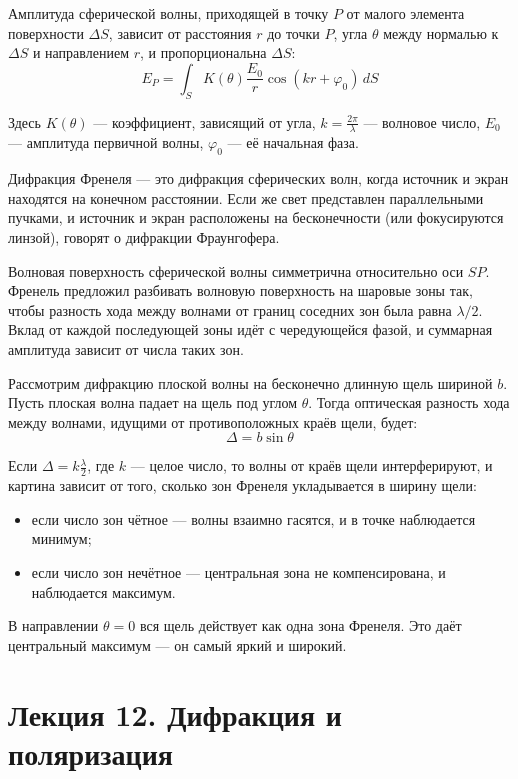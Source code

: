 \documentclass[12pt]{article}
\begin{document}
Амплитуда сферической волны, приходящей в точку $P$ от малого элемента поверхности $\Delta S$, зависит от расстояния $r$ до точки $P$, угла $\theta$ между нормалью к $\Delta S$ и направлением $r$, и пропорциональна $\Delta S$:
\[ E_P = \int_S K(\theta) \frac{E_0}{r} \cos(kr + \varphi_0)\, dS \]

Здесь $K(\theta)$ — коэффициент, зависящий от угла, $k = \frac{2\pi}{\lambda}$ — волновое число, $E_0$ — амплитуда первичной волны, $\varphi_0$ — её начальная фаза.

Дифракция Френеля — это дифракция сферических волн, когда источник и экран находятся на конечном расстоянии. Если же свет представлен параллельными пучками, и источник и экран расположены на бесконечности (или фокусируются линзой), говорят о дифракции Фраунгофера.

Волновая поверхность сферической волны симметрична относительно оси $SP$. Френель предложил разбивать волновую поверхность на шаровые зоны так, чтобы разность хода между волнами от границ соседних зон была равна $\lambda/2$. Вклад от каждой последующей зоны идёт с чередующейся фазой, и суммарная амплитуда зависит от числа таких зон.

Рассмотрим дифракцию плоской волны на бесконечно длинную щель шириной $b$. Пусть плоская волна падает на щель под углом $\theta$. Тогда оптическая разность хода между волнами, идущими от противоположных краёв щели, будет:
\[ \Delta = b \sin \theta \]

Если $\Delta = k\frac{\lambda}{2}$, где $k$ — целое число, то волны от краёв щели интерферируют, и картина зависит от того, сколько зон Френеля укладывается в ширину щели:
\begin{itemize}
  \item если число зон чётное — волны взаимно гасятся, и в точке наблюдается минимум;
  \item если число зон нечётное — центральная зона не компенсирована, и наблюдается максимум.
\end{itemize}

В направлении $\theta = 0$ вся щель действует как одна зона Френеля. Это даёт центральный максимум — он самый яркий и широкий.






\section{Лекция 12. Дифракция и поляризация}
\end{document}
